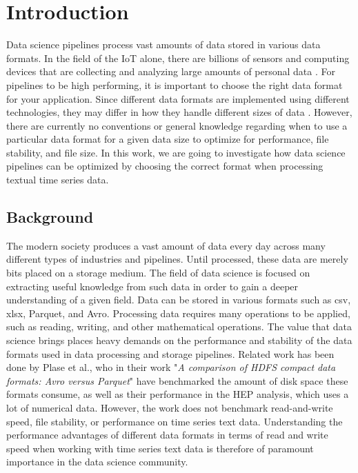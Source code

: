 \section{Introduction}
\label{sect:introduction}
Data science pipelines process vast amounts of data stored in various data formats. In the field of the \gls{IoT} alone, there are billions of sensors and computing devices that are collecting and analyzing large amounts of personal data \cite{noauthor_state_2022}. For pipelines to be high performing, it is important to choose the right data format for your application. Since different data formats are implemented using different technologies, they may differ in how they handle different sizes of data \cite{cao_data_2017}. However, there are currently no conventions or general knowledge regarding when to use a particular data format for a given data size to optimize for performance, file stability, and file size. In this work, we are going to investigate how data science pipelines can be optimized by choosing the correct format when processing textual time series data. 


\subsection{Background}
\label{sec:introbac}
The modern society produces a vast amount of data every day across many different types of industries and pipelines. Until processed, these data are merely bits placed on a storage medium. The field of data science is focused on extracting useful knowledge from such data in order to gain a deeper understanding of a given field. Data can be stored in various formats such as csv, xlsx, Parquet, and Avro. Processing data requires many operations to be applied, such as reading, writing, and other mathematical operations. The value that data science brings places heavy demands on the performance and stability of the data formats used in data processing and storage pipelines. Related work has been done by Plase et al., who in their work "\textit{A comparison of HDFS compact data formats: Avro versus Parquet}" have benchmarked the amount of disk space these formats consume, as well as their performance in the \gls{HEP} analysis, which uses a lot of numerical data. However, the work does not benchmark read-and-write speed, file stability, or performance on time series text data. Understanding the performance advantages of different data formats in terms of read and write speed when working with time series text data is therefore of paramount importance in the data science community\cite{plase_comparison_2017, cao_data_2017}.

